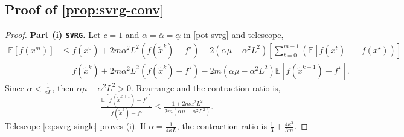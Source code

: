 \documentclass{article}
\theoremstyle{definition}
\newcommand{\svrg}{\texttt{SVRG}}
\begin{document}
\subsection{Proof of \cref{prop:svrg-conv}}
\begin{proof}
  \textbf{Part (i) {\svrg}.} Let $c = 1$ and
  $\alpha = \bar{\alpha} = \underline{\alpha}$ in \eqref{pot-svrg} and telescope,
  \begin{align*}
    \mathbb{E} [f (x^m)] &{}\leq f (x^0) + 2 m \alpha^2 L^2 (f (\tilde{x}^k)
    - f^{\star}) - 2 (\alpha \mu - \alpha^2 L^2) \left[ \sum_{t = 0}^{m - 1}
    (\mathbb{E} [f (x^t)] - f (x^{\star})) \right]\\
    &{}= f (\tilde{x}^k) + 2 m \alpha^2 L^2 (f (\tilde{x}^k) - f^{\star}) -
    2 m (\alpha \mu - \alpha^2 L^2) \mathbb{E} [f (\tilde{x}^{k + 1}) -
    f^{\star}] .
  \end{align*}
  Since $\alpha < \tfrac{1}{\kappa L}$, then $\alpha \mu - \alpha^2 L^2 > 0$.
  Rearrange and the contraction ratio is,
  \begin{equation}
    \tfrac{\mathbb{E} [f (\tilde{x}^{k + 1}) - f^{\star}]}{f (\tilde{x}^k) -
    f^{\star}} \leq \tfrac{1 + 2 m \alpha^2 L^2}{2 m (\alpha \mu - 
    \alpha^2 L^2)} . \label{eq:svrg-single}
  \end{equation}
  Telescope \eqref{eq:svrg-single} proves (i). If $\alpha = \tfrac{1}{4 \kappa
  L}$, the contraction ratio is $\tfrac{1}{3} + \tfrac{4 \kappa^2}{3 m}$.
  

\end{proof}
\end{document}
